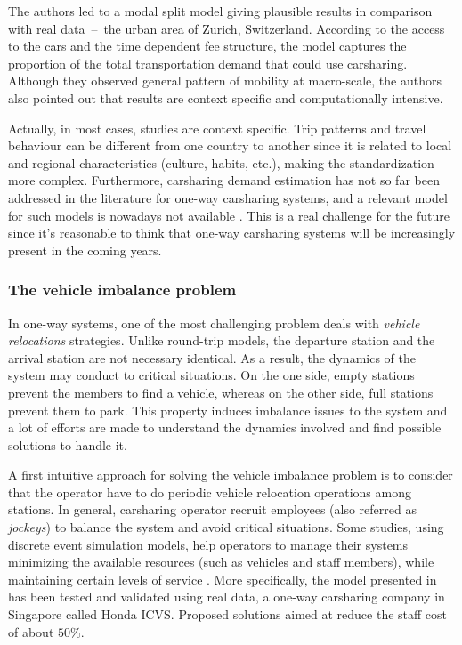 \begin{bibunit}[ieeetr]
The authors led to a modal split model giving plausible results in comparison with real \mbox{data -- the} urban area of Zurich, Switzerland.
According to the access to the cars and the time dependent fee structure, the model captures the proportion of the total transportation demand that could use carsharing.
Although they observed general pattern of mobility at macro-scale, the authors also pointed out that results are context specific and computationally intensive.


\bigskip
Actually, in most cases, studies are context specific.
Trip patterns and travel behaviour can be different from one country to another since it is related to local and regional characteristics (culture, habits, etc.), making the standardization more complex.
Furthermore, carsharing demand estimation has not so far been addressed in the literature for one-way carsharing systems, and a relevant model for such models is nowadays not available \cite{jorge_carsharing_2013}.
This is a real challenge for the future since it's reasonable to think that one-way carsharing systems will be increasingly present in the coming years.



\subsubsection{The vehicle imbalance problem}
In one-way systems, one of the most challenging problem deals with \emph{vehicle relocations} strategies.
Unlike round-trip models, the departure station and the arrival station are not necessary identical.
As a result, the dynamics of the system may conduct to critical situations.
On the one side, empty stations prevent the members to find a vehicle, whereas on the other side, full stations prevent them to park.
This property induces imbalance issues to the system and a lot of efforts are made to understand the dynamics involved and find possible solutions to handle it.

\medskip
A first intuitive approach for solving the vehicle imbalance problem is to consider that the operator have to do periodic vehicle relocation operations among stations.
In general, carsharing operator recruit employees (also referred as \emph{jockeys}) to balance the system and avoid critical situations.
Some studies, using discrete event simulation models, help operators to manage their systems minimizing the available resources (such as vehicles and staff members), while maintaining certain levels of service \cite{barth_simulation_1999, kek_relocation_2006, kek_decision_2009}.
More specifically, the model presented in \cite{kek_decision_2009} has been tested and validated using real data, a one-way carsharing company in Singapore called Honda ICVS.
Proposed solutions aimed at reduce the staff cost of about $50$\%.


\end{bibunit}
